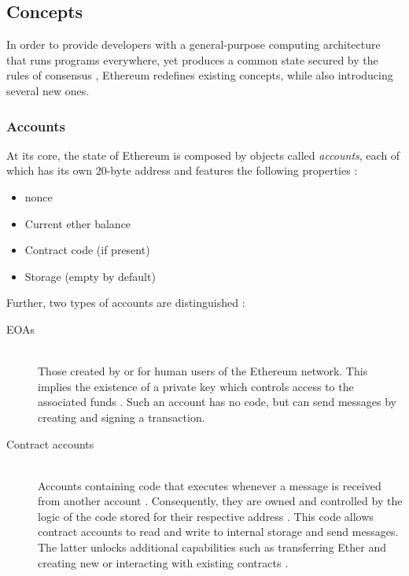 

\subsection{Concepts}
In order to provide developers with a general-purpose computing architecture that runs programs everywhere, yet produces a common state secured by the rules of consensus \cite[p.~31]{Antonopoulos.2018}, Ethereum redefines existing concepts, while also introducing several new ones.

\subsubsection{Accounts}
At its core, the state of Ethereum is composed by objects called \textit{accounts}, each of which has its own 20-byte address and features the following properties \cite[p.~17]{ethereumWhitepaperGitHub}: 

\begin{itemize}
  \item \Gls{nonce}
  \item Current ether balance
  \item Contract code (if present)
  \item Storage (empty by default)
\end{itemize}

Further, two types of accounts are distinguished \cite[p.~17]{ethereumWhitepaperGitHub}:

\begin{description}
	\item[\acp{EOA}]
	\hfill \\
	Those created by or for human users of the Ethereum network. This implies the existence of a private key which controls access to the associated funds \cite[p.~13]{Antonopoulos.2018}. Such an account has no code, but can send messages by creating and signing a transaction.
	\item[Contract accounts]
	\hfill \\
	Accounts containing code that executes whenever a message is received from another account \cite[p.~13]{Antonopoulos.2018}. Consequently, they are owned and controlled by the logic of the code stored for their respective address \cite[p.~57]{Antonopoulos.2018}. This code allows contract accounts to read and write to internal storage and send messages. The latter unlocks additional capabilities such as transferring Ether and creating new or interacting with existing contracts \cite[p.~19]{ethereumWhitepaperGitHub}.
\end{description}


